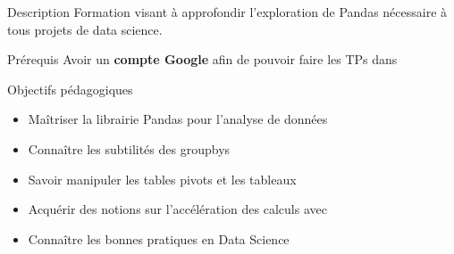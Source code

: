 \begin{frame}{Description}
  Formation visant à approfondir l'exploration de Pandas nécessaire à tous projets de data science.
\end{frame}

\begin{frame}{Prérequis}
  Avoir un \textbf{compte Google} afin de pouvoir faire les TPs dans 
\end{frame}

\begin{frame}{Objectifs pédagogiques}

\begin{itemize}
  \item Maîtriser la librairie Pandas pour l’analyse de données
  \item Connaître les subtilités des groupbys
  \item Savoir manipuler les tables pivots et les tableaux 
  \item Acquérir des notions sur l’accélération des calculs avec 
  \item Connaître les bonnes pratiques en Data Science
\end{itemize}

\end{frame}
